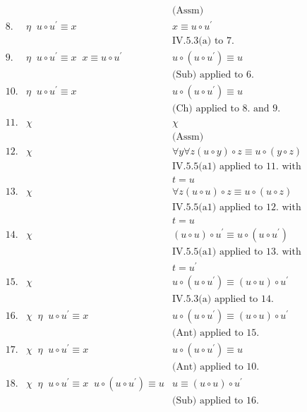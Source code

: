 \begin{enumerate}[1.]
\[\begin{array}{lll}
\  & \ & \mbox{(Assm)} \\
8. & \eta \;\; u \circ u^\prime \equiv x & x \equiv u \circ u^\prime \\
\  & \ & \mbox{IV.5.3(a) to 7.} \\
9. & \eta \;\; u \circ u^\prime \equiv x \;\; x \equiv u \circ u^\prime & u \circ (u \circ u^\prime) \equiv u \\
\  & \                                & \mbox{(Sub) applied to 6.} \\
10. & \eta \;\; u \circ u^\prime \equiv x & u \circ (u \circ u^\prime) \equiv u \\
\  & \                                & \mbox{(Ch) applied to 8. and 9.} \\
11. & \chi & \chi \\
\  & \ & \mbox{(Assm)} \\
12. & \chi & \forall y \forall z (u \circ y) \circ z \equiv u \circ (y \circ z) \\
\  & \ & \mbox{IV.5.5(a1) applied to 11. with} \\
\  & \ & \mbox{$t = u$} \\
13. & \chi & \forall z (u \circ u) \circ z \equiv u \circ (u \circ z) \\
\  & \ & \mbox{IV.5.5(a1) applied to 12. with} \\
\  & \ & \mbox{$t = u$} \\
14. & \chi & (u \circ u) \circ u^\prime \equiv u \circ (u \circ u^\prime) \\
\   & \ & \mbox{IV.5.5(a1) applied to 13. with} \\
\   & \ & \mbox{$t = u^\prime$} \\
15. & \chi & u \circ (u \circ u^\prime) \equiv (u \circ u) \circ u^\prime \\
\   & \ & \mbox{IV.5.3(a) applied to 14.} \\
16. & \chi \;\; \eta \;\; u \circ u^\prime \equiv x & u \circ (u \circ u^\prime) \equiv (u \circ u) \circ u^\prime \\
\   & \ & \mbox{(Ant) applied to 15.} \\
17. & \chi \;\; \eta \;\; u \circ u^\prime \equiv x & u \circ (u \circ u^\prime) \equiv u \\
\   & \                                       & \mbox{(Ant) applied to 10.} \\
18. & \chi \;\; \eta \;\; u \circ u^\prime \equiv x  \;\; u \circ (u \circ u^\prime) \equiv u & u \equiv (u \circ u) \circ u^\prime \\
\   & \ & \mbox{(Sub) applied to 16.} \\

\end{array}\]
\end{enumerate}
